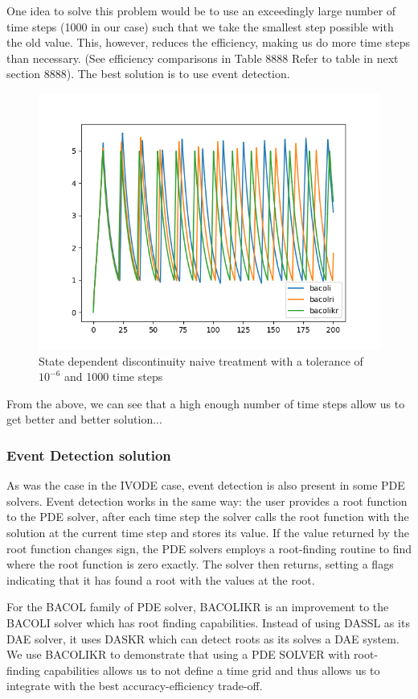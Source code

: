 \documentclass{article}
\begin{document}
One idea to solve this problem would be to use an exceedingly large number of time steps (1000 in our case) such that we take the smallest step possible with the old value. This, however, reduces the efficiency, making us do more time steps than necessary. (See efficiency comparisons in Table 8888 Refer to table in next section 8888). The best solution is to use event detection.

\begin{figure}[H]
\centering
\includegraphics[width=0.7\linewidth]{./figures/pde_state_disc_naive_1000}
\caption{State dependent discontinuity naive treatment with a tolerance of $10^{-6}$ and 1000 time steps}
\label{fig:pde_state_disc_naive_1000}
\end{figure}
 
From the above, we can see that a high enough number of time steps allow us to get better and better solution...

\subsubsection{Event Detection solution}
As was the case in the IVODE case, event detection is also present in some PDE solvers. Event detection works in the same way: the user provides a root function to the PDE solver, after each time step the solver calls the root function with the solution at the current time step and stores its value. If the value returned by the root function changes sign, the PDE solvers employs a root-finding routine to find where the root function is zero exactly. The solver then returns, setting a flags indicating that it has found a root with the values at the root.
 
For the BACOL family of PDE solver, BACOLIKR is an improvement to the BACOLI solver which has root finding capabilities. Instead of using DASSL as its DAE solver, it uses DASKR which can detect roots as its solves a DAE system. We use BACOLIKR to demonstrate that using a PDE SOLVER with root-finding capabilities allows us to not define a time grid and thus allows us to integrate with the best accuracy-efficiency trade-off.  
\end{document}
